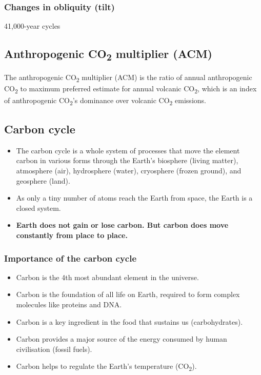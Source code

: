 \documentclass[11pt]{article}
\begin{document}
\subsubsection{Changes in obliquity (tilt)}
\label{sec:org2b280a9}
41,000-year cycles

\subsection{Anthropogenic CO\textsubscript{2} multiplier (ACM)}
\label{sec:orgd77f144}
The anthropogenic CO\textsubscript{2} multiplier (ACM) is the ratio of annual anthropogenic CO\textsubscript{2} to maximum preferred estimate for annual volcanic CO\textsubscript{2}, which is an index of anthropogenic CO\textsubscript{2}'s dominance over volcanic CO\textsubscript{2} emissions.

\subsection{Carbon cycle}
\label{sec:org8752ebf}
\begin{itemize}
\item The carbon cycle is a whole system of processes that move the element carbon in various forms through the Earth's biosphere (living matter), atmosphere (air), hydrosphere (water), cryosphere (frozen ground), and geosphere (land).
\item As only a tiny number of atoms reach the Earth from space, the Earth is a closed system.
\item \textbf{Earth does not gain or lose carbon. But carbon does move constantly from place to place.}
\end{itemize}

\newpage

\subsubsection{Importance of the carbon cycle}
\label{sec:org0f8178a}
\begin{itemize}
\item Carbon is the 4th most abundant element in the universe.
\item Carbon is the foundation of all life on Earth, required to form complex molecules like proteins and DNA.
\item Carbon is a key ingredient in the food that sustains us (carbohydrates).
\item Carbon provides a major source of the energy consumed by human civilisation (fossil fuels).
\item Carbon helps to regulate the Earth's temperature (CO\textsubscript{2}).
\end{itemize}
\end{document}
